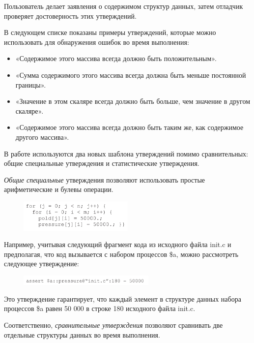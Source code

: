 Пользователь делает заявления о содержимом структур данных, затем отладчик проверяет достоверность этих утверждений.

В следующем списке показаны примеры утверждений, которые можно использовать для обнаружения ошибок во время выполнения:

\begin{itemize}
	\item «Содержимое этого массива всегда должно быть положительным».
	\item «Сумма содержимого этого массива всегда должна быть меньше постоянной границы».
	\item «Значение в этом скаляре всегда должно быть больше, чем значение в другом скаляре».
	\item «Содержимое этого массива всегда должно быть таким же, как содержимое другого массива». 
\end{itemize}

В работе используются два новых шаблона утверждений помимо сравнительных: общие специальные утверждения и статистические утверждения.

\textit{Общие специальные} утверждения позволяют использовать простые арифметические и булевы операции.

\begin{figure}[!ht]
	\includegraphics[width=0.5\textwidth]{ResearchNotes/rndhpc_not_dbg_2021_11_10/data_prog.png}
\end{figure}

Например, учитывая следующий фрагмент кода из исходного файла \textsf{init.c} и предполагая, что код вызывается с набором процессов \$a, можно рассмотреть следующее утверждение:

\begin{figure}[!ht]
	\includegraphics[width=0.6\textwidth]{ResearchNotes/rndhpc_not_dbg_2021_11_10/assert1.png}
\end{figure}

Это утверждение гарантирует, что каждый элемент в структуре данных набора процессов \$a равен 50 000 в строке 180 исходного файла \textsf{init.c}.

Соответственно, \textit{сравнительные утверждения} позволяют сравнивать две отдельные структуры данных во время выполнения.


